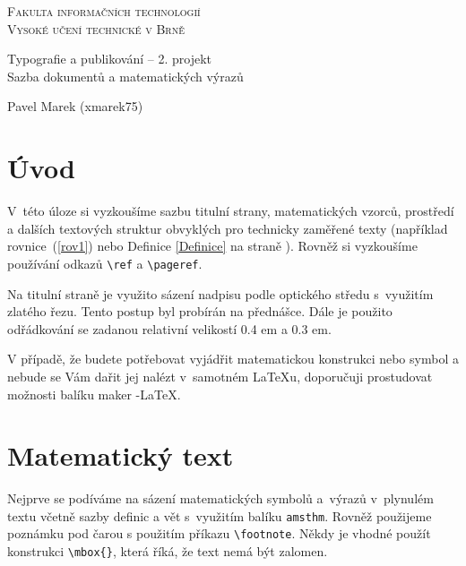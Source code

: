 \documentclass[a4paper, 11pt, twocolumn]{article}
\theoremstyle{definition}
\begin{document}
\begin{titlepage}

\begin{center}
\Huge
\textsc{Fakulta informačních technologií\\
Vysoké učení technické v Brně} \\

\LARGE
Typografie a publikování -- 2. projekt \\
Sazba dokumentů a matematických výrazů \\
\end{center}

{\Large \the\year \hfill
Pavel Marek (xmarek75)}
\end{titlepage}

\section*{Úvod}

V~této úloze si vyzkoušíme sazbu titulní strany, matematic\-kých vzorců, prostředí a dalších textových struktur obvyk\-lých pro technicky zaměřené texty
(například rovnice~(\ref{rov1}) nebo Definice \ref{Definice} na straně \pageref{Definice}). Rovněž si vyzkoušíme pou\-žívání odkazů \verb|\ref| a \verb|\pageref|.

Na titulní straně je využito sázení nadpisu podle op\-tického středu s~využitím zlatého řezu. Tento postup byl probírán na přednášce. Dále je použito odřádkování se zadanou relativní velikostí 0.4 em a 0.3 em.

V případě, že budete potřebovat vyjádřit matematickou konstrukci nebo symbol a nebude se Vám dařit jej nalézt v~samotném {\LaTeX}u, doporučuji prostudovat možnosti ba\-líku maker \AmS-\LaTeX.

\section {Matematický text}

Nejprve se podíváme na sázení matematických symbolů a~výrazů v~plynulém textu včetně sazby definic a vět s~vy\-užitím balíku \verb|amsthm|. Rovněž použijeme poznámku pod čarou s použitím příkazu \verb|\footnote|. Někdy je vhodné použít konstrukci \verb|\mbox{}|, která říká, že text nemá být zalomen.
\end{document}
